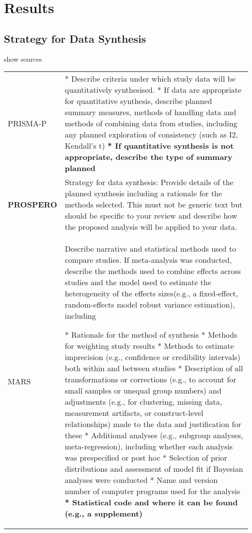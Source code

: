 \documentclass[
]{article}
\begin{document}
\hypertarget{results}{%
\section{Results}\label{results}}

\hypertarget{strategy-for-data-synthesis}{%
\subsection{Strategy for Data
Synthesis}\label{strategy-for-data-synthesis}}

show sources

\hypertarget{sfds}{}
\begin{collapse}

\begin{table}[H]
\centering
\begin{tabular}{>{}l|l}
\hline
\cellcolor[HTML]{ececec}{source} & \cellcolor[HTML]{ececec}{description}\\
\hline
PRISMA-P & * Describe criteria under which study data will be quantitatively synthesised.
* If data are appropriate for quantitative synthesis, describe planned summary measures, methods of handling data and methods of combining data from studies, including any planned exploration of consistency (such as I2, Kendall’s t)
\textbf{* If quantitative synthesis is not appropriate, describe the type of summary planned}\\
\hline
\textbf{PROSPERO} & Strategy for data synthesis: Provide details of the planned synthesis including a rationale for the methods selected. This must not be generic text but should be specific to your review and describe how the proposed analysis will be applied to your data.\\
\hline
MARS & Describe narrative and statistical methods used to compare studies. If meta-analysis was conducted, describe the methods used to combine effects across studies and the model used to estimate the heterogeneity of the effects sizes(e.g., a fixed-effect, random-effects model robust variance estimation), including

* Rationale for the method of synthesis
* Methods for weighting study results
* Methods to estimate imprecision (e.g., confidence or credibility intervals) both within and between studies
* Description of all transformations or corrections (e.g., to account for small samples or unequal group numbers) and adjustments (e.g., for clustering, missing data, measurement artifacts, or construct-level relationships) made to the data and justification for these
* Additional analyses (e.g., subgroup analyses, meta-regression), including whether each analysis was prespecified or post hoc
* Selection of prior distributions and assessment of model fit if Bayesian analyses were conducted
* Name and version number of computer programs used for the analysis
\textbf{* Statistical code and where it can be found (e.g., a supplement)}\\
\hline
\end{tabular}
\end{table}

\end{collapse}
\end{document}
